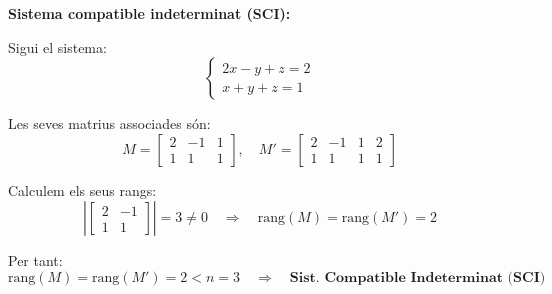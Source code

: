 \documentclass[12pt]{article}
\begin{document}
\begin{exemple}
\textbf{Sistema compatible indeterminat (SCI):}

Sigui el sistema:
\[
\begin{cases}
2x - y + z = 2 \\
x + y + z = 1
\end{cases}
\]

Les seves matrius associades són:
\[
M =
\begin{bmatrix}
2 & -1 & 1 \\
1 & 1 & 1
\end{bmatrix}, \quad
M' =
\begin{bmatrix}
2 & -1 & 1 & 2 \\
1 & 1 & 1 & 1
\end{bmatrix}
\]

Calculem els seus rangs:
\[
\left| 
\begin{bmatrix}
2 & -1 \\
1 & 1
\end{bmatrix}
\right| = 3 \neq 0 \quad \Rightarrow \quad \text{rang}(M) = \text{rang}(M') = 2
\]

Per tant:
\[
\text{rang}(M) = \text{rang}(M') = 2 < n = 3 \quad \Rightarrow \quad \textbf{Sist. Compatible Indeterminat (SCI)}
\]
\end{exemple}
\end{document}
